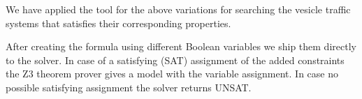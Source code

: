 We have applied the tool for the above variations for searching the vesicle traffic systems that satisfies
their corresponding properties. 



After creating the formula using different Boolean variables we ship them directly to the solver. In case of a satisfying (SAT) assignment of the added constraints the Z3 theorem prover gives a model with the variable assignment. In case no possible satisfying assignment the solver returns UNSAT.
%
%







